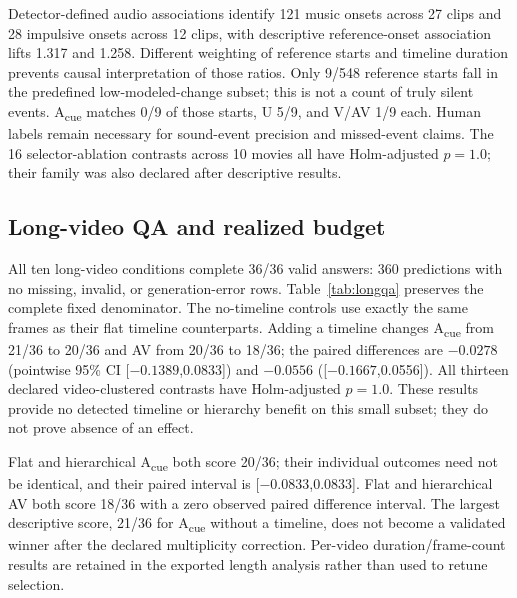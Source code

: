 \documentclass[10pt,twocolumn]{article}
\newcommand{\Acue}{A\textsubscript{cue}}
\begin{document}
Detector-defined audio associations identify 121 music onsets across 27 clips and 28 impulsive onsets across 12 clips, with descriptive reference-onset association lifts 1.317 and 1.258. Different weighting of reference starts and timeline duration prevents causal interpretation of those ratios. Only 9/548 reference starts fall in the predefined low-modeled-change subset; this is not a count of truly silent events. \Acue{} matches 0/9 of those starts, U 5/9, and V/AV 1/9 each. Human labels remain necessary for sound-event precision and missed-event claims. The 16 selector-ablation contrasts across 10 movies all have Holm-adjusted $p=1.0$; their family was also declared after descriptive results.

\subsection{Long-video QA and realized budget}
All ten long-video conditions complete 36/36 valid answers: 360 predictions with no missing, invalid, or generation-error rows. Table~\ref{tab:longqa} preserves the complete fixed denominator. The no-timeline controls use exactly the same frames as their flat timeline counterparts. Adding a timeline changes \Acue{} from 21/36 to 20/36 and AV from 20/36 to 18/36; the paired differences are $-0.0278$ (pointwise 95\% CI [$-0.1389$,0.0833]) and $-0.0556$ ([$-0.1667$,0.0556]). All thirteen declared video-clustered contrasts have Holm-adjusted $p=1.0$. These results provide no detected timeline or hierarchy benefit on this small subset; they do not prove absence of an effect.

\begin{table}[h]
\centering\scriptsize

\caption{Long Video-MME: 36 questions from 12 videos per condition, all valid. Intervals are pointwise video-bootstrap 95\% intervals. A/AV have fewer realized frames than U/V; cross-selector differences are constrained-budget diagnostics.}\label{tab:longqa}
\end{table}

Flat and hierarchical \Acue{} both score 20/36; their individual outcomes need not be identical, and their paired interval is [$-0.0833$,0.0833]. Flat and hierarchical AV both score 18/36 with a zero observed paired difference interval. The largest descriptive score, 21/36 for \Acue{} without a timeline, does not become a validated winner after the declared multiplicity correction. Per-video duration/frame-count results are retained in the exported length analysis rather than used to retune selection.
\end{document}
